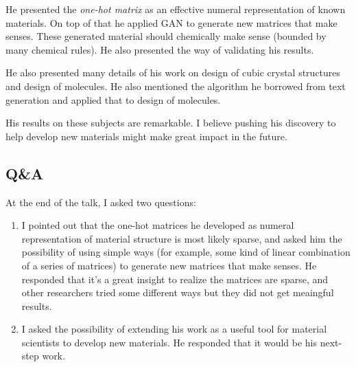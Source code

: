 \documentclass[11pt, oneside]{article}   	%
\begin{document}
He presented the \emph{one-hot matrix} as an effective numeral representation of known materials. On top of that he applied GAN to generate new matrices that make senses. These generated material should chemically make sense (bounded by many chemical rules). He also presented the way of validating his results.

He also presented many details of his work on design of cubic crystal structures and design of molecules. He also mentioned the algorithm he borrowed from text generation and applied that to design of molecules. 

His results on these subjects are remarkable. I believe pushing his discovery to help develop new materials might make great impact in the future.


\subsection{Q\&A}
At the end of the talk, I asked two questions: 
\begin{enumerate}
\item I pointed out that the one-hot matrices he developed as numeral representation of material structure is most likely sparse, and asked him the possibility of using simple ways (for example, some kind of linear combination of a series of matrices) to generate new matrices that make senses. He responded that it's a great insight to realize the matrices are sparse, and other researchers tried some different ways but they did not get meaingful results. 
\item I asked the possibility of extending his work as a useful tool for material scientists to develop new materials. He responded that it would be his next-step work.
\end{enumerate}
\end{document}
